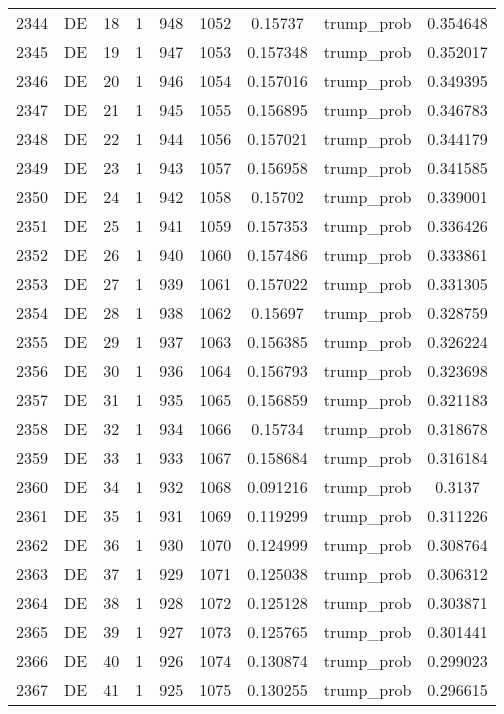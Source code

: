\documentclass[12pt,a4paper]{article}
\begin{document}
\begin{tabular}{r|cccccccc}
	2344 & DE & 18 & 1 & 948 & 1052 & 0.15737 & trump\_prob & 0.354648 \\
	2345 & DE & 19 & 1 & 947 & 1053 & 0.157348 & trump\_prob & 0.352017 \\
	2346 & DE & 20 & 1 & 946 & 1054 & 0.157016 & trump\_prob & 0.349395 \\
	2347 & DE & 21 & 1 & 945 & 1055 & 0.156895 & trump\_prob & 0.346783 \\
	2348 & DE & 22 & 1 & 944 & 1056 & 0.157021 & trump\_prob & 0.344179 \\
	2349 & DE & 23 & 1 & 943 & 1057 & 0.156958 & trump\_prob & 0.341585 \\
	2350 & DE & 24 & 1 & 942 & 1058 & 0.15702 & trump\_prob & 0.339001 \\
	2351 & DE & 25 & 1 & 941 & 1059 & 0.157353 & trump\_prob & 0.336426 \\
	2352 & DE & 26 & 1 & 940 & 1060 & 0.157486 & trump\_prob & 0.333861 \\
	2353 & DE & 27 & 1 & 939 & 1061 & 0.157022 & trump\_prob & 0.331305 \\
	2354 & DE & 28 & 1 & 938 & 1062 & 0.15697 & trump\_prob & 0.328759 \\
	2355 & DE & 29 & 1 & 937 & 1063 & 0.156385 & trump\_prob & 0.326224 \\
	2356 & DE & 30 & 1 & 936 & 1064 & 0.156793 & trump\_prob & 0.323698 \\
	2357 & DE & 31 & 1 & 935 & 1065 & 0.156859 & trump\_prob & 0.321183 \\
	2358 & DE & 32 & 1 & 934 & 1066 & 0.15734 & trump\_prob & 0.318678 \\
	2359 & DE & 33 & 1 & 933 & 1067 & 0.158684 & trump\_prob & 0.316184 \\
	2360 & DE & 34 & 1 & 932 & 1068 & 0.091216 & trump\_prob & 0.3137 \\
	2361 & DE & 35 & 1 & 931 & 1069 & 0.119299 & trump\_prob & 0.311226 \\
	2362 & DE & 36 & 1 & 930 & 1070 & 0.124999 & trump\_prob & 0.308764 \\
	2363 & DE & 37 & 1 & 929 & 1071 & 0.125038 & trump\_prob & 0.306312 \\
	2364 & DE & 38 & 1 & 928 & 1072 & 0.125128 & trump\_prob & 0.303871 \\
	2365 & DE & 39 & 1 & 927 & 1073 & 0.125765 & trump\_prob & 0.301441 \\
	2366 & DE & 40 & 1 & 926 & 1074 & 0.130874 & trump\_prob & 0.299023 \\
	2367 & DE & 41 & 1 & 925 & 1075 & 0.130255 & trump\_prob & 0.296615 \\

\end{tabular}
\end{document}
